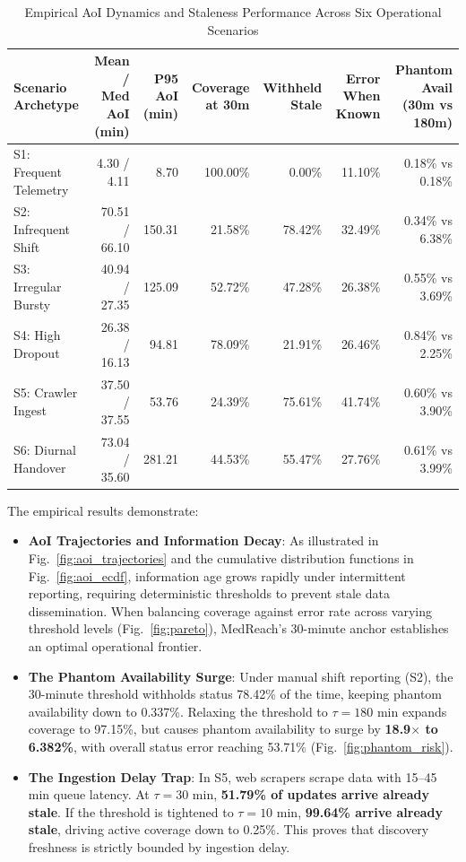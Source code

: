\documentclass[conference]{IEEEtran}
\begin{document}
\begin{table}[t]
\centering
\caption{Empirical AoI Dynamics and Staleness Performance Across Six Operational Scenarios}
\label{tab:aoi}
\begin{tabularx}{\textwidth}{X r r r r r r}
\toprule
\textbf{Scenario Archetype} & \textbf{Mean / Med AoI (min)} & \textbf{P95 AoI (min)} & \textbf{Coverage at 30m} & \textbf{Withheld Stale} & \textbf{Error When Known} & \textbf{Phantom Avail (30m vs 180m)} \\
\midrule
S1: Frequent Telemetry & 4.30 / 4.11 & 8.70 & 100.00\% & 0.00\% & 11.10\% & 0.18\% vs 0.18\% \\
S2: Infrequent Shift & 70.51 / 66.10 & 150.31 & 21.58\% & 78.42\% & 32.49\% & 0.34\% vs 6.38\% \\
S3: Irregular Bursty & 40.94 / 27.35 & 125.09 & 52.72\% & 47.28\% & 26.38\% & 0.55\% vs 3.69\% \\
S4: High Dropout & 26.38 / 16.13 & 94.81 & 78.09\% & 21.91\% & 26.46\% & 0.84\% vs 2.25\% \\
S5: Crawler Ingest & 37.50 / 37.55 & 53.76 & 24.39\% & 75.61\% & 41.74\% & 0.60\% vs 3.90\% \\
S6: Diurnal Handover & 73.04 / 35.60 & 281.21 & 44.53\% & 55.47\% & 27.76\% & 0.61\% vs 3.99\% \\
\bottomrule
\end{tabularx}
\end{table}

The empirical results demonstrate:
\begin{itemize}
    \item \textbf{AoI Trajectories and Information Decay}: As illustrated in Fig.~\ref{fig:aoi_trajectories} and the cumulative distribution functions in Fig.~\ref{fig:aoi_ecdf}, information age grows rapidly under intermittent reporting, requiring deterministic thresholds to prevent stale data dissemination. When balancing coverage against error rate across varying threshold levels (Fig.~\ref{fig:pareto}), MedReach's 30-minute anchor establishes an optimal operational frontier.
    \item \textbf{The Phantom Availability Surge}: Under manual shift reporting (S2), the 30-minute threshold withholds status 78.42\% of the time, keeping phantom availability down to 0.337\%. Relaxing the threshold to $\tau = 180\text{ min}$ expands coverage to 97.15\%, but causes phantom availability to surge by \textbf{18.9$\times$ to 6.382\%}, with overall status error reaching 53.71\% (Fig.~\ref{fig:phantom_risk}).
    \item \textbf{The Ingestion Delay Trap}: In S5, web scrapers scrape data with 15--45 min queue latency. At $\tau = 30\text{ min}$, \textbf{51.79\% of updates arrive already stale}. If the threshold is tightened to $\tau = 10\text{ min}$, \textbf{99.64\% arrive already stale}, driving active coverage down to 0.25\%. This proves that discovery freshness is strictly bounded by ingestion delay.
\end{itemize}
\end{document}
